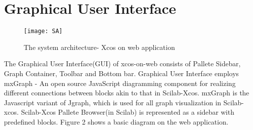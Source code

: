 \documentclass[conference]{IEEEtran}
\begin{document}
\section{Graphical User Interface}
\begin{figure}
    \centering
    \texttt{[image: SA]}
    \caption{The system architecture- Xcos on web application}
    \label{fig:my_label}
\end{figure}
\iffalse
* --What mxgraph is \\                        
* --Mxrgaph Js equivalent of JGraphX \\
* 
* --Wires connection with mid-point snapping and multiple way-points was implemented on the web. \\
* --Created a custom delete function to delete all the edges related to a selected mxCell vertices. \\
* --Implemented connection constraints. (Rules) \\
* Rotate, mirror function \\
* Completed the 'link function' -- Each recently created link in the web application can now be styled depending on the source of each link and a 'name' attribute has been set to uniquely identify each type of link. \\
* edges - text label, label font family, label font size, label text color
* --Split-block is now displayed over it's immediate associated edges. \\
* --Tooltip \\
* --port constraints and rules\\
* --right side frame on editor\\
*zoom, print, redo, undo etx\\
*right click functionality(all)\\
*how the details were mapped with data structures\\
*colour wheel jquery code
*import export button fucntionality not working..that will be explained in server side\\
\fi

The Graphical User Interface(GUI) of xcos-on-web consists of Pallete Sidebar, Graph Container, Toolbar and Bottom bar. Graphical User Interface employs mxGraph - An open source JavaScript diagramming component for realizing different connections between blocks akin to that in Scilab-Xcos. mxGraph is the Javascript variant of Jgraph, which is used for all graph visualization in Scilab-xcos. Scilab-Xcos Pallete Browser(in Scilab) is represented as a sidebar with predefined blocks. Figure 2 shows a basic diagram on the web application.
\end{document}
